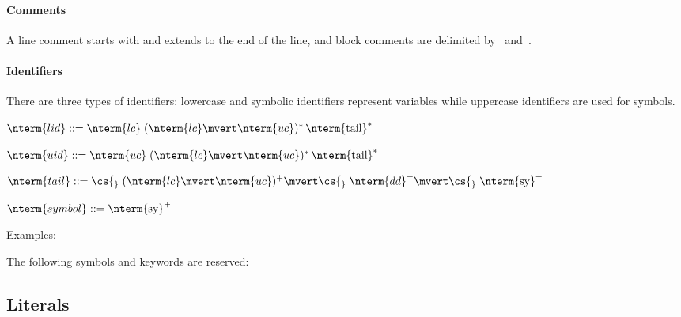 \paragraph{Comments}
A line comment starts with \cs{;;} and extends to the end of the line, and block comments
are delimited by \cs{[;}~and~\cs{;]}.

\paragraph{Identifiers}
There are three types of identifiers\?: lowercase and symbolic identifiers represent variables
while uppercase identifiers are used for symbols.

\begin{display}\small
  $\nterm{lid} ::= \nterm{lc}\;(\nterm{lc} \mvert \nterm{uc})^*\, \text{\nterm{tail}}^*$

  \medskip
  $\nterm{uid} ::= \nterm{uc}\;(\nterm{lc} \mvert \nterm{uc})^*\, \text{\nterm{tail}}^*$

  \medskip
  $\nterm{tail} ::= \cs{_}\;(\nterm{lc} \mvert \nterm{uc})^+
                 \mvert \cs{_}\;\nterm{dd}^+
                 \mvert \cs{_}\;\text{\nterm{sy}}^+$

  \medskip
  $\nterm{symbol} ::= \text{\nterm{sy}}^+$
\end{display}
Examples\?:
\begin{display}\small
  \quad{}

  \medskip

  \medskip
  \cs{<<|:}\quad\cs{**}\quad\cs{+/-}
\end{display}
The following symbols and keywords are reserved\?:


\subsection{Literals}

